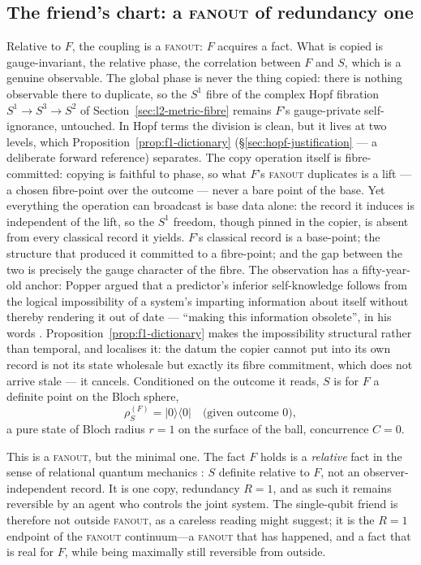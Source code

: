 \subsection{The friend's chart: a \textsc{fanout} of redundancy one}
\label{sec:wf-friend}

Relative to $F$, the coupling is a \textsc{fanout}: $F$ acquires a fact. What is
copied is gauge-invariant, the relative phase, the correlation between $F$ and
$S$, which is a genuine observable. The global phase is never the thing copied:
there is nothing observable there to duplicate, so the $S^{1}$ fibre of the
complex Hopf fibration $S^{1}\to S^{3}\to S^{2}$ of
Section~\ref{sec:l2-metric-fibre} remains $F$'s gauge-private self-ignorance,
untouched. In Hopf terms the division is clean, but it lives at two levels, which
Proposition~\ref{prop:f1-dictionary} (\S\ref{sec:hopf-justification} --- a deliberate forward
reference) separates. The copy operation itself is fibre-committed:
copying is faithful to phase, so what $F$'s \textsc{fanout} duplicates is a lift --- a chosen
fibre-point over the outcome --- never a bare point of the base. Yet everything the operation can
broadcast is base data alone: the record it induces is independent of the lift, so the $S^{1}$
freedom, though pinned in the copier, is absent from every classical record it yields. $F$'s classical record is a
base-point; the structure that produced it committed to a fibre-point; and the gap between the two
is precisely the gauge character of the fibre. The observation has a fifty-year-old
anchor: Popper argued that a predictor's inferior self-knowledge follows from the logical
impossibility of a system's imparting information about itself without thereby rendering it out of
date --- ``making this information obsolete'', in his words
\autocites{Popper1950a}[Part~II, p.~187]{Popper1950b}. Proposition~\ref{prop:f1-dictionary}
makes the impossibility structural rather than temporal, and localises it: the datum the copier
cannot put into its own record is not its state wholesale but exactly its fibre commitment, which
does not arrive stale --- it cancels. Conditioned on the outcome it reads, $S$ is for
$F$ a definite point on the Bloch sphere,
\begin{equation}
  \rho_{S}^{(F)}=\lvert 0\rangle\langle 0\rvert
  \quad\text{(given outcome }0\text{)},
\end{equation}
a pure state of Bloch radius $r=1$ on the surface of the ball, concurrence $C=0$.

This is a \textsc{fanout}, but the minimal one. The fact $F$ holds is a
\emph{relative} fact in the sense of relational quantum mechanics
\autocite{Rovelli1996a}: $S$ definite relative to $F$, not an observer-independent
record. It is one copy, redundancy $R=1$, and as such it remains reversible by an
agent who controls the joint system. The single-qubit friend is therefore not
outside \textsc{fanout}, as a careless reading might suggest; it is the $R=1$
endpoint of the \textsc{fanout} continuum---a \textsc{fanout} that has happened,
and a fact that is real for $F$, while being maximally still reversible from
outside.

